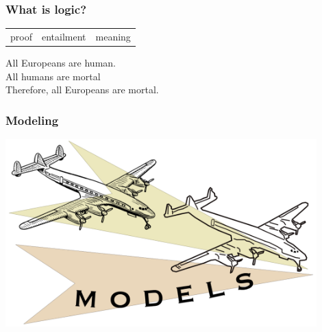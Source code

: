 \documentclass[fleqn,10pt,serif,xcolor=svgnames,xcolor=table,aspectratio=169,handout]{beamer}
\begin{document}
\begin{frame}
  \frametitle{What is logic?}

  \begin{center}
    \begin{Large}
      \begin{tabular}{C{2cm}C{4cm}C{2cm}}
        proof & entailment & meaning
      \end{tabular}
    \end{Large}
  \end{center}

  \pause
  \bigskip

  \begin{center}
    All Europeans are human.\\
    All humans are mortal\\
    Therefore, all Europeans are mortal.
  \end{center}
\end{frame}

\begin{frame}
  \frametitle{Modeling}

  \includegraphics[width=0.9\textwidth]{00-introduction-pics/model-planes.png}

\end{frame}
\end{document}
